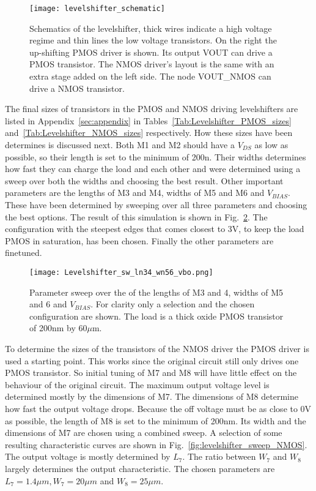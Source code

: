 \begin{figure}[h]
 \texttt{[image: levelshifter\_schematic]}
 \caption{Schematics of the levelshifter, thick wires indicate a high voltage regime and thin lines the low voltage transistors. On the right the up-shifting PMOS driver is shown. Its output VOUT can drive a PMOS transistor. The NMOS driver's layout is the same with an extra stage added on the left side. The node VOUT\_NMOS can drive a NMOS transistor.}
 \label{fig:schematic_levelshifter}
\end{figure}
The final sizes of transistors in the PMOS and NMOS driving levelshifters are listed in Appendix~\ref{sec:appendix} in Tables~\ref{Tab:Levelshifter_PMOS_sizes} and~\ref{Tab:Levelshifter_NMOS_sizes} respectively. How these sizes have been determines is discussed next. Both M1 and M2 should have a $V_{DS}$ as low as possible, so their length is set to the minimum of 200n. Their widths determines how fast they can charge the load and each other and were determined using a sweep over both the widths and choosing the best result. Other important parameters are the lengths of M3 and M4, widths of M5 and M6 and $V_{BIAS}$. These have been determined by sweeping over all three parameters and choosing the best options. The result of this simulation is shown in Fig.~\ref{fig:levelshifter_sweep_PMOS}. The configuration with the steepest edges that comes closest to 3V, to keep the load PMOS in saturation, has been chosen. Finally the other parameters are finetuned.
\begin{figure}[h]
 \texttt{[image: Levelshifter\_sw\_ln34\_wn56\_vbo.png]}
 \caption{Parameter sweep over the of the lengths of M3 and 4, widths of M5 and 6 and $V_{BIAS}$. For clarity only a selection and the chosen configuration are shown. The load is a thick oxide PMOS transistor of 200nm by 60$\mu$m.}
 \label{fig:levelshifter_sweep_PMOS}
\end{figure}
To determine the sizes of the transistors of the NMOS driver the PMOS driver is used a starting point. This works since the original circuit still only drives one PMOS transistor. So initial tuning of M7 and M8 will have little effect on the behaviour of the original circuit. The maximum output voltage level is determined mostly by the dimensions of M7. The dimensions of M8 determine how fast the output voltage drops. Because the off voltage must be as close to 0V as possible, the length of M8 is set to the minimum of 200nm. Its width and the dimensions of M7 are chosen using a combined sweep. A selection of some resulting characteristic curves are shown in Fig.~\ref{fig:levelshifter_sweep_NMOS}. The output voltage is mostly determined by $L_7$. The ratio between $W_7$ and $W_8$ largely determines the output characteristic. The chosen parameters are $L_7=1.4\mu m, W_7=20\mu m$ and $W_8=25\mu m$.
